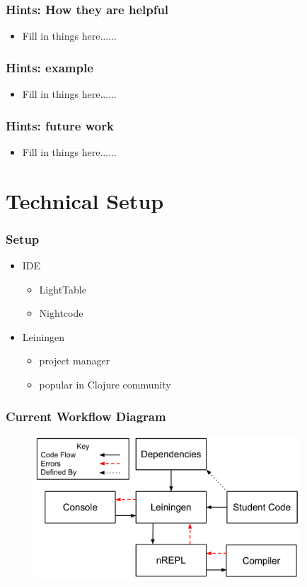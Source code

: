 \documentclass{beamer}
\begin{document}
\begin{frame}
\frametitle{Hints: How they are helpful}
	\begin{itemize}
  	 \item Fill in things here......
	 \end{itemize}
\end{frame}

\begin{frame}
\frametitle{Hints: example}
	\begin{itemize}
  	 \item Fill in things here......
	 \end{itemize}
\end{frame}

\begin{frame}
\frametitle{Hints: future work}
	\begin{itemize}
  	 \item Fill in things here......
	 \end{itemize}
\end{frame}
\section{Technical Setup}
\begin{frame}
\frametitle{Setup}
	\begin{itemize}
		\item IDE
		\begin{itemize}
			\item LightTable
			\item Nightcode
		\end{itemize}
		\item Leiningen
		\begin{itemize}
			\item project manager
			\item popular in Clojure community
		\end{itemize}
	\end{itemize}
\end{frame}

\begin{frame}[fragile]
\frametitle{Current Workflow Diagram}
\begin{figure}[h]
 \includegraphics[width=10cm]{../CurrentErrorHandling.pdf}
 \centering
\end{figure}
\end{frame}
\end{document}
